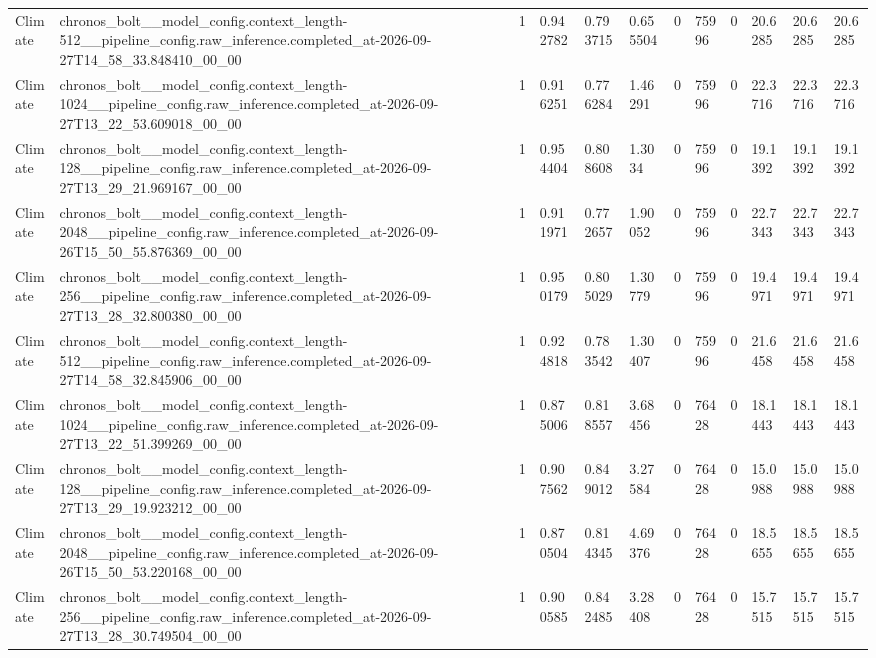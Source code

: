 \begin{tabular}{llllllllllll}
Climate & chronos\_bolt\_\_model\_config.context\_length-512\_\_pipeline\_config.raw\_inference.completed\_at-2026-09-27T14\_58\_33.848410\_00\_00 & 1 & 0.942782 & 0.793715 & 0.655504 & 0 & 75996 & 0 & 20.6285 & 20.6285 & 20.6285 \\
Climate & chronos\_bolt\_\_model\_config.context\_length-1024\_\_pipeline\_config.raw\_inference.completed\_at-2026-09-27T13\_22\_53.609018\_00\_00 & 1 & 0.916251 & 0.776284 & 1.46291 & 0 & 75996 & 0 & 22.3716 & 22.3716 & 22.3716 \\
Climate & chronos\_bolt\_\_model\_config.context\_length-128\_\_pipeline\_config.raw\_inference.completed\_at-2026-09-27T13\_29\_21.969167\_00\_00 & 1 & 0.954404 & 0.808608 & 1.3034 & 0 & 75996 & 0 & 19.1392 & 19.1392 & 19.1392 \\
Climate & chronos\_bolt\_\_model\_config.context\_length-2048\_\_pipeline\_config.raw\_inference.completed\_at-2026-09-26T15\_50\_55.876369\_00\_00 & 1 & 0.911971 & 0.772657 & 1.90052 & 0 & 75996 & 0 & 22.7343 & 22.7343 & 22.7343 \\
Climate & chronos\_bolt\_\_model\_config.context\_length-256\_\_pipeline\_config.raw\_inference.completed\_at-2026-09-27T13\_28\_32.800380\_00\_00 & 1 & 0.950179 & 0.805029 & 1.30779 & 0 & 75996 & 0 & 19.4971 & 19.4971 & 19.4971 \\
Climate & chronos\_bolt\_\_model\_config.context\_length-512\_\_pipeline\_config.raw\_inference.completed\_at-2026-09-27T14\_58\_32.845906\_00\_00 & 1 & 0.924818 & 0.783542 & 1.30407 & 0 & 75996 & 0 & 21.6458 & 21.6458 & 21.6458 \\
Climate & chronos\_bolt\_\_model\_config.context\_length-1024\_\_pipeline\_config.raw\_inference.completed\_at-2026-09-27T13\_22\_51.399269\_00\_00 & 1 & 0.875006 & 0.818557 & 3.68456 & 0 & 76428 & 0 & 18.1443 & 18.1443 & 18.1443 \\
Climate & chronos\_bolt\_\_model\_config.context\_length-128\_\_pipeline\_config.raw\_inference.completed\_at-2026-09-27T13\_29\_19.923212\_00\_00 & 1 & 0.907562 & 0.849012 & 3.27584 & 0 & 76428 & 0 & 15.0988 & 15.0988 & 15.0988 \\
Climate & chronos\_bolt\_\_model\_config.context\_length-2048\_\_pipeline\_config.raw\_inference.completed\_at-2026-09-26T15\_50\_53.220168\_00\_00 & 1 & 0.870504 & 0.814345 & 4.69376 & 0 & 76428 & 0 & 18.5655 & 18.5655 & 18.5655 \\
Climate & chronos\_bolt\_\_model\_config.context\_length-256\_\_pipeline\_config.raw\_inference.completed\_at-2026-09-27T13\_28\_30.749504\_00\_00 & 1 & 0.900585 & 0.842485 & 3.28408 & 0 & 76428 & 0 & 15.7515 & 15.7515 & 15.7515 \\

\end{tabular}
